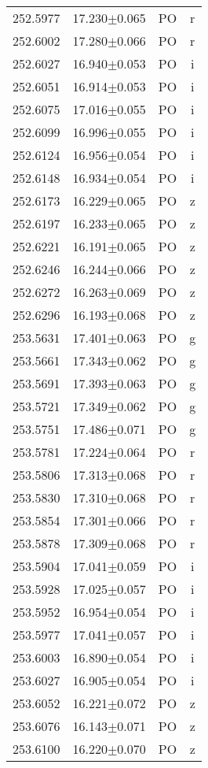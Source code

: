\begin{table}
\begin{tabular}{cccc}
252.5977 & 17.230$\pm$0.065 & PO & r \\
252.6002 & 17.280$\pm$0.066 & PO & r \\
252.6027 & 16.940$\pm$0.053 & PO & i \\
252.6051 & 16.914$\pm$0.053 & PO & i \\
252.6075 & 17.016$\pm$0.055 & PO & i \\
252.6099 & 16.996$\pm$0.055 & PO & i \\
252.6124 & 16.956$\pm$0.054 & PO & i \\
252.6148 & 16.934$\pm$0.054 & PO & i \\
252.6173 & 16.229$\pm$0.065 & PO & z \\
252.6197 & 16.233$\pm$0.065 & PO & z \\
252.6221 & 16.191$\pm$0.065 & PO & z \\
252.6246 & 16.244$\pm$0.066 & PO & z \\
252.6272 & 16.263$\pm$0.069 & PO & z \\
252.6296 & 16.193$\pm$0.068 & PO & z \\
253.5631 & 17.401$\pm$0.063 & PO & g \\
253.5661 & 17.343$\pm$0.062 & PO & g \\
253.5691 & 17.393$\pm$0.063 & PO & g \\
253.5721 & 17.349$\pm$0.062 & PO & g \\
253.5751 & 17.486$\pm$0.071 & PO & g \\
253.5781 & 17.224$\pm$0.064 & PO & r \\
253.5806 & 17.313$\pm$0.068 & PO & r \\
253.5830 & 17.310$\pm$0.068 & PO & r \\
253.5854 & 17.301$\pm$0.066 & PO & r \\
253.5878 & 17.309$\pm$0.068 & PO & r \\
253.5904 & 17.041$\pm$0.059 & PO & i \\
253.5928 & 17.025$\pm$0.057 & PO & i \\
253.5952 & 16.954$\pm$0.054 & PO & i \\
253.5977 & 17.041$\pm$0.057 & PO & i \\
253.6003 & 16.890$\pm$0.054 & PO & i \\
253.6027 & 16.905$\pm$0.054 & PO & i \\
253.6052 & 16.221$\pm$0.072 & PO & z \\
253.6076 & 16.143$\pm$0.071 & PO & z \\
253.6100 & 16.220$\pm$0.070 & PO & z \\

\end{tabular}
\end{table}
